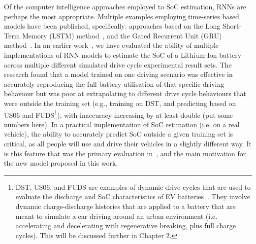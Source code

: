 %
%
Of the computer intelligence approaches employed to SoC estimation, RNNs are perhaps the most appropriate.
Multiple examples employing time-series based models have been published, specifically: approaches based on the Long Short-Term Memory (LSTM) method~\cite{Chemali2017,mamo_long_2020,zhang_deep_2020}, and the Gated Recurrent Unit (GRU) method~\cite{song_lithium-ion_2018,jiao_gru-rnn_2020,xiao_accurate_2019,javid_adaptive_2020}.
In an earlier work~\cite{sadykov_practical_2022}, we have evaluated the ability of multiple implementations of RNN models to estimate the SoC of a Lithium-Ion battery across multiple different simulated drive cycle experimental result sets.
The research found that a model trained on one driving scenario was effective in accurately reproducing the full battery utilisation of that specific driving behaviour but was poor at extrapolating to different drive cycle behaviours that were outside the training set (e.g., training on DST, and predicting based on US06 and FUDS\footnote{DST, US06, and FUDS are examples of dynamic drive cycles that are used to evaluate the discharge and SoC characteristics of EV batteries~\cite{castillo_18_2015}. They involve dynamic charge-discharge histories that are applied to a battery that are meant to simulate a car driving around an urban environment (i.e. accelerating and decelerating with regenerative breaking, plus full charge cycles). This will be discussed further in Chapter 2.}), with inaccuracy increasing by at least double (put some numbers here).
In a practical implementation of SoC estimation (i.e. on a real vehicle), the ability to accurately predict SoC outside a given training set is critical, as all people will use and drive their vehicles in a slightly different way.
It is this feature that was the primary evaluation in~\cite{sadykov_practical_2022}, and the main motivation for the new model proposed in this work.

